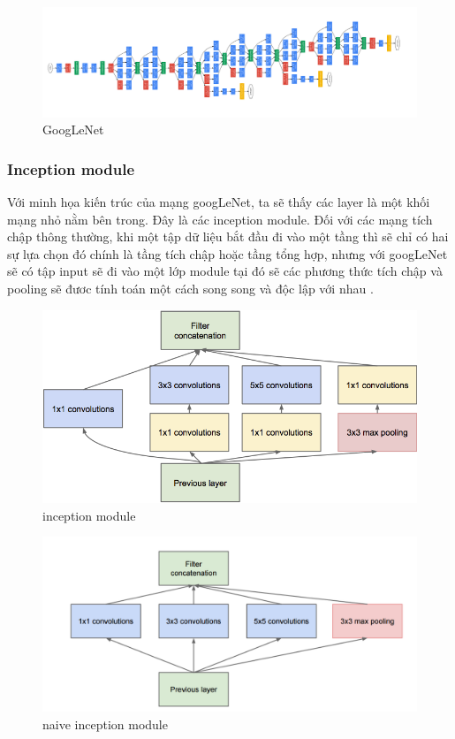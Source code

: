 		
	\begin{figure}[h!]
			\centering
			\includegraphics[scale=0.7]{charts/googlenet.png}
			\caption{GoogLeNet}
			\label{fig:googlenet}
		\end{figure}
		
	
	\subsubsection{Inception module}
	Với minh họa kiến trúc của mạng googLeNet, ta sẽ thấy các layer là một khối mạng nhỏ nằm bên trong. Đây là các inception module. Đối với các mạng tích chập thông thường, khi một tập dữ liệu bắt đầu đi vào một tầng thì sẽ chỉ có hai sự lựa chọn đó chính là tầng tích chập hoặc tầng tổng hợp, nhưng với googLeNet sẽ có tập input sẽ đi vào một lớp module tại đó sẽ các phương thức tích chập và pooling sẽ đươc tính toán một cách song song và độc lập với nhau \cite{1}.
	
	\begin{figure}[h!]
			\centering
			\includegraphics[scale=1.5]{charts/inception.png}
			\caption{inception module}
			\label{fig:inception}
	\end{figure}

	\begin{figure}[h!]
			\centering
			\includegraphics[scale=0.3]{charts/inception_nai.png}
			\caption{naive inception module}
			\label{fig:nai_inception}
	\end{figure}
		
